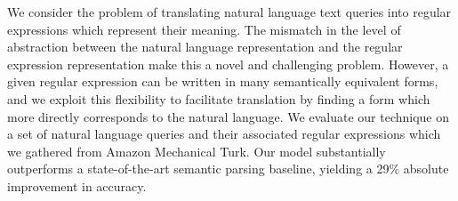 We consider the problem of translating natural language text queries into regular expressions which represent their meaning.  The mismatch in the level
 of abstraction between the natural language representation and the regular
 expression representation make this a novel and challenging problem.  However,
 a given regular expression can be written in many semantically equivalent
 forms, and we exploit this flexibility to facilitate translation by finding a
 form which more directly corresponds to the natural language.  We evaluate our
 technique on a set of natural language queries and their associated regular
 expressions which we gathered from Amazon Mechanical Turk.  Our model
 substantially outperforms a state-of-the-art semantic parsing baseline,
 yielding a 29\% absolute improvement in accuracy.

